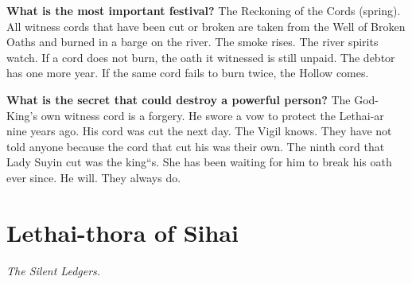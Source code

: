 \begin{almanac}
\textbf{What is the most important festival?} The Reckoning of the Cords (spring). All witness cords that have been cut or broken are taken from the Well of Broken Oaths and burned in a barge on the river. The smoke rises. The river spirits watch. If a cord does not burn, the oath it witnessed is still unpaid. The debtor has one more year. If the same cord fails to burn twice, the Hollow comes.

\textbf{What is the secret that could destroy a powerful person?} The God-King's own witness cord is a forgery. He swore a vow to protect the Lethai-ar nine years ago. His cord was cut the next day. The Vigil knows. They have not told anyone because the cord that cut his was their own. The ninth cord that Lady Suyin cut was the king``s. She has been waiting for him to break his oath ever since. He will. They always do.
\end{almanac}

\newpage

\newpage

\chapter{Lethai-thora of Sihai}
\label{chap:lethai-thora}

\emph{The Silent Ledgers.}

